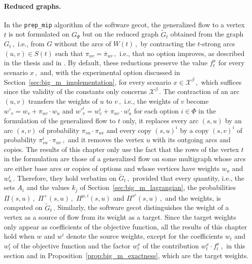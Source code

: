 \documentclass[11pt,a4paper]{report}
\theoremstyle{definition}
\theoremstyle{remark}
\begin{document}
\paragraph{Reduced graphs.}
In the \texttt{prep\_mip} algorithm of the software gecot, the generalized flow to a vertex $t$ is not formulated on $G_\Psi$ but on the reduced graph $\widetilde{G}_t$ obtained from the graph $G_t\,,$ i.e., from $G$ without the arcs of $W(t)\,,$ by contracting the $t$-strong arcs $(u,v) \in S(t)$ such that $\pi_{uv} = \overline{\pi}_{uv}\,,$ i.e., that no option improves, as described in the thesis and in \cite{OPTIMIZING-CONNECTIVITY_HAMONIC_2022}. By default, these reductions preserve the value $f^x_t$ for every scenario $x\,,$ and, with the experimental option discussed in Section~\ref{sec:big_m_implementation}, for every scenario $x \in \mathcal{X}^\beta\,,$ which suffices since the validity of the constants only concerns $\mathcal{X}^\beta\,.$ The contraction of an arc $(u,v)$ transfers the weights of $u$ to $v\,,$ i.e., the weights of $v$ become $w'_v = w_v + \pi_{uv} \cdot w_u$ and $w'^i_v = w^i_v + \pi_{uv} \cdot w^i_u$ for each option $i \in \Phi$ in the formulation of the generalized flow to $t$ only, it replaces every arc $(s,u)$ by an arc $(s,v)$ of probability $\pi_{su} \cdot \pi_{uv}$ and every copy $(s,u)^i$ by a copy $(s,v)^i$ of probability $\pi^i_{su} \cdot \pi_{uv}\,,$ and it removes the vertex $u$ with its outgoing arcs and copies. The results of this chapter only use the fact that the rows of the vertex $t$ in the formulation are those of a generalized flow on some multigraph whose arcs are either base arcs or copies of options and whose vertices have weights $w_u$ and $w^i_u\,.$ Therefore, they hold verbatim on $\widetilde{G}_t\,,$ provided that every quantity, i.e., the sets $A_i$ and the values $k_j$ of Section~\ref{sec:big_m_lagrangian}, the probabilities $\Pi(s,u)\,,$ $\Pi^+(s,u)\,,$ $\Pi^{\mu,i}(s,u)$ and $\Pi^{x^i}(s,u)\,,$ and the weights, is computed on $\widetilde{G}_t\,.$ Similarly, the software gecot distinguishes the weight of a vertex as a source of flow from its weight as a target. Since the target weights only appear as coefficients of the objective function, all the results of this chapter hold when $w$ and $w^i$ denote the source weights, except for the coefficients $w_t$ and $w^i_t$ of the objective function and the factor $w^x_t$ of the contribution $w^x_t \cdot f^x_t\,,$ in this section and in Proposition~\ref{prop:big_m_exactness}, which are the target weights.
\end{document}
